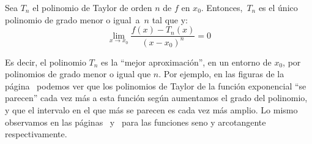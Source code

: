 \begin{teorema}\label{th:deftay} Sea $T_n$ el polinomio de Taylor de orden $n$ de $f$
en $x_0$. Entonces,~$T_n$ es el único polinomio de grado menor o igual~a~$n$ tal que
y:
\[
\lim_{x\to x_0}\dfrac{f(x)-T_n(x)}{(x-x_0)^n}=0
\]
\end{teorema}

Es decir, el polinomio $T_n$ es la ``mejor aproximación'', en un entorno de $x_0$, por polinomios de grado menor o igual que $n$.
Por ejemplo, en las figuras de la página~\pageref{ej:taylor-exp} podemos ver que los polinomios de Taylor de la función exponencial ``se parecen'' cada vez más a esta función según aumentamos el grado del polinomio, y que el intervalo en el que más se parecen es cada vez más amplio.
Lo mismo observamos en las páginas~\pageref{fig:sentaylor} y~\pageref{fig:tgtaylor} para las funciones seno y arcotangente respectivamente.

